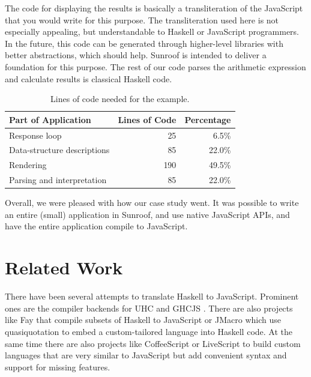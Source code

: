 \documentclass{llncs}
\begin{document}
The code for displaying the results is basically a 
transliteration of the JavaScript that you would write for this 
purpose.
The transliteration used here is not especially appealing,
but understandable to Haskell or JavaScript programmers.
In the future, this code can be generated through higher-level 
libraries with better abstractions, which should help.
Sunroof is intended to deliver a foundation for this purpose.
The rest of our code parses the arithmetic expression and calculate 
results is classical Haskell code. 

\begin{table}[t]
\begin{center}
\vspace{0.1in}
\begin{tabular}{l@{\quad}r@{\quad}r}
\hline\rule{0pt}{12pt}%
Part of Application & Lines of Code & Percentage \\[2pt]
\hline\rule{0pt}{12pt}%
Response loop & 25 & 6.5\% \\[2pt]
Data-structure descriptions & 85 & 22.0\% \\[2pt]
Rendering & 190 & 49.5\% \\[2pt]
Parsing and interpretation & 85 & 22.0\% \\[2pt]
\hline
\end{tabular}
\end{center}
\caption{Lines of code needed for the example.}
\label{tab:example-statistics}
\vspace{-0.5cm}
\end{table} 

Overall, we were pleased with how our case study went.
It was possible to write an entire (small) application
in Sunroof, and use native JavaScript APIs, and have
the entire application compile to JavaScript. 

\section{Related Work}

There have been several attempts to translate Haskell to JavaScript.
Prominent ones are the compiler backends for 
UHC \cite{Stutterheim:12:ImprovingUHCJavaScriptBackend} and 
GHCJS \cite{project:ghcjs}. There are also projects like Fay \cite{project:fay} 
that compile subsets of Haskell to JavaScript or JMacro \cite{project:jmacro}
which use quasiquotation \cite{Mainland:07:QuasiquotingHaskell} to embed 
a custom-tailored language into Haskell code.
%
At the same time there are also projects like 
CoffeeScript \cite{project:coffeescript} or LiveScript \cite{project:livescript}
to build custom languages 
that are very similar to JavaScript but add convenient syntax and
support for missing features.
\end{document}
